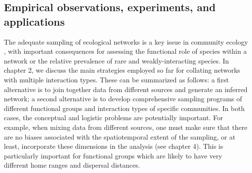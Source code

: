 \subsection*{Empirical observations, experiments, and applications}

The adequate sampling of ecological networks is a key issue in community ecology \citep{Jordano2016}, with important consequences for assessing the functional role of species within a network or the relative prevalence of rare and weakly-interacting species. In chapter 2, we discuss the main strategies employed so far for collating networks with multiple interaction types. These can be summarized as follows: a first alternative is to join together data from different sources and generate an inferred network; a second alternative is to develop comprehensive sampling programs of different functional groups and interaction types of specific communities. In both cases, the conceptual and logistic problems are potentially important. For example, when mixing data from different sources, one must make sure that there are no biases associated with the spatiotemporal extent of the sampling, or at least, incorporate these dimensions in the analysis (see chapter 4). This is particularly important for functional groups which are likely to have very different home ranges and dispersal distances.

